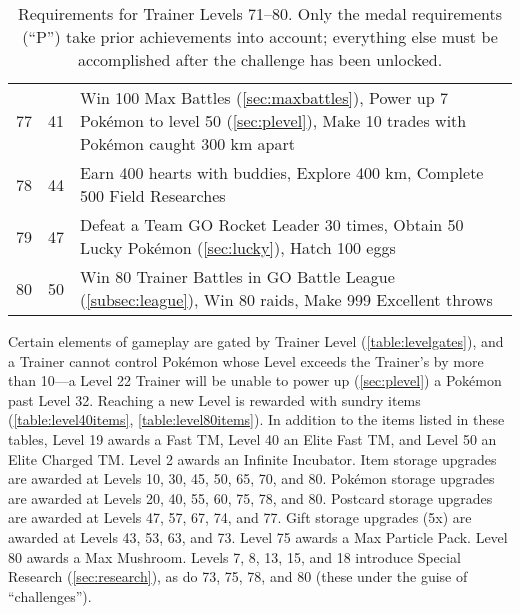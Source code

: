 \begin{table}
\begin{tabular}{rrp{}}
  77 & 41 & Win 100 Max Battles (\autoref{sec:maxbattles}),\newline
  Power up 7 Pokémon to level 50 (\autoref{sec:plevel}),\newline
  Make 10 trades with Pokémon caught 300 km apart\\
\rowcolor{Gray!25}
  78 & 44 & Earn 400 hearts with buddies,\newline
  Explore 400 km,\newline
  Complete 500 Field Researches\\
  79 & 47 & Defeat a Team GO Rocket Leader 30 times,\newline
  Obtain 50 Lucky Pokémon (\autoref{sec:lucky}),\newline
  Hatch 100 eggs\\
\rowcolor{Gray!25}
  80 & 50 & Win 80 Trainer Battles in GO Battle League (\autoref{subsec:league}),\newline
  Win 80 raids,\newline
  Make 999 Excellent throws\\
\end{tabular}
\caption[Requirements for Trainer Levels 71--80]{Requirements for Trainer Levels 71--80.
   Only the medal requirements (``P'') take prior achievements into account; everything else
   must be accomplished after the challenge has been unlocked.\label{table:xp71plus}}
\end{table}
Certain elements of gameplay are gated by Trainer Level (\autoref{table:levelgates}),
  and a Trainer cannot control Pokémon whose Level exceeds the Trainer's
  by more than 10---a Level 22 Trainer will be unable to power up (\autoref{sec:plevel}) a Pokémon past Level 32.
Reaching a new Level is rewarded with sundry items (\autoref{table:level40items}, \autoref{table:level80items}).
In addition to the items listed in these tables, Level 19 awards a Fast TM, Level 40 an Elite Fast TM, and Level 50 an Elite Charged TM.
Level 2 awards an Infinite Incubator.
Item storage upgrades are awarded at Levels 10, 30, 45, 50, 65, 70, and 80.
Pokémon storage upgrades are awarded at Levels 20, 40, 55, 60, 75, 78, and 80.
Postcard storage upgrades are awarded at Levels 47, 57, 67, 74, and 77.
Gift storage upgrades (5x) are awarded at Levels 43, 53, 63, and 73.
Level 75 awards a Max Particle Pack.
Level 80 awards a Max Mushroom.
Levels 7, 8, 13, 15, and 18 introduce Special Research (\autoref{sec:research}), as do
 73, 75, 78, and 80 (these under the guise of ``challenges'').

